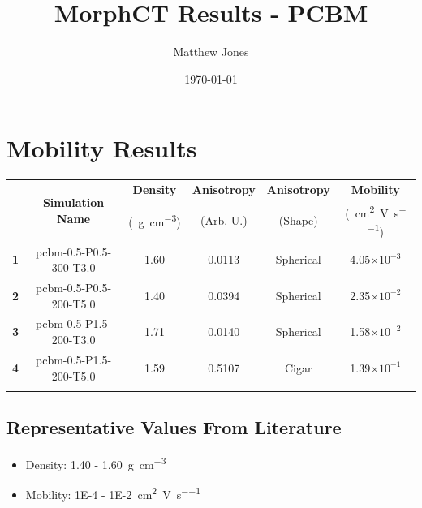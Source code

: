 \documentclass[12pt]{article}
\title{MorphCT Results - PCBM}
\author{Matthew Jones}
\date{\today}
\def\mobunits{\square\centi\meter\per\volt\per\second}
\def\gcm{\gram\per\cubic\centi\meter}
\def\ccg{\cellcolor{gray}}
\begin{document}
\maketitle

\section{Mobility Results}

\begin{center}
\begin{tabular}{| c | c | c | c | c | c |}
\hline
\rule{0pt}{2.5ex} 
\multirow{2}{*}{\textbf{ID}}&\multirow{2}{*}{\textbf{Simulation Name}}&\textbf{Density}&\textbf{Anisotropy}&\textbf{Anisotropy}&\textbf{Mobility}\\
&&(\SI{}{\gcm})&(Arb. U.)&(Shape)&(\SI{}{\mobunits})\\
\hhline{|======|}
\textbf{\ccg1}&\rule{0pt}{2.5ex}\ccg pcbm-0.5-P0.5-300-T3.0&\ccg 1.60&\ccg 0.0113&\ccg Spherical&\ccg4.05$\times 10^{-3}$\\
\textbf{2}&\rule{0pt}{2.5ex}pcbm-0.5-P0.5-200-T5.0&1.40&0.0394&Spherical&2.35$\times 10^{-2}$\\
\textbf{\ccg3}&\rule{0pt}{2.5ex}\ccg pcbm-0.5-P1.5-200-T3.0&\ccg 1.71&\ccg 0.0140&\ccg Spherical&\ccg1.58$\times 10^{-2}$\\
\textbf{4}&\rule{0pt}{2.5ex}pcbm-0.5-P1.5-200-T5.0&1.59&0.5107&Cigar&1.39$\times 10^{-1}$\\
\hhline{------}
\end{tabular}\label{table:mobResults}
\end{center}

\subsection{Representative Values From Literature}
\begin{itemize}
    \item{Density: 1.40 - \SI{1.60}{\gcm}\cite{Arias2006,Kiel2010b,Bulle-Lieuwma2003}}
    \item{Mobility: \SI{1E-4}{} - \SI{1E-2}{\mobunits}\cite{Tuladhar2005}}
\end{itemize}
\end{document}
